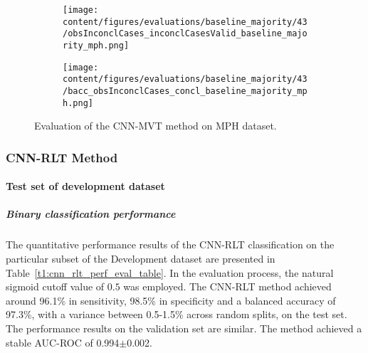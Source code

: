 \begin{figure}[ht]
  \begin{subfigure}{0.49\textwidth}
    \centering
    \texttt{[image: content/figures/evaluations/baseline\_majority/43/obsInconclCases\_inconclCasesValid\_baseline\_majority\_mph.png]}
    \label{fig:obsInconclCases_inconclCasesValid_baseline_majority_mph}
  \end{subfigure}
  \hfill
  \begin{subfigure}{0.49\textwidth}
    \centering
    \texttt{[image: content/figures/evaluations/baseline\_majority/43/bacc\_obsInconclCases\_concl\_baseline\_majority\_mph.png]}
    \label{fig:bacc_obsInconclCases_concl_baseline_majority_mph}
  \end{subfigure}
  \caption{Evaluation of the CNN-MVT method on MPH dataset.}
  \label{fig:perf_results_mvt_mph}
\end{figure}


\subsubsection{CNN-RLT Method}
\label{subsubsec:eval_rlt}


\paragraph{Test set of development dataset}


\subparagraph{Binary classification performance}

The quantitative performance results of the CNN-RLT classification on the 
particular subset of the Development dataset are presented in Table~\ref{t1:cnn_rlt_perf_eval_table}.
In the evaluation process, the natural sigmoid cutoff value of $0.5$ was employed.
The CNN-RLT method achieved around 96.1\% in sensitivity, 98.5\% in specificity and a balanced accuracy of 97.3\%, 
with a variance between 0.5-1.5\% across random splits, on the test set.
The performance results on the validation set are similar.
The method achieved a stable AUC-ROC of 0.994$\pm$0.002.


